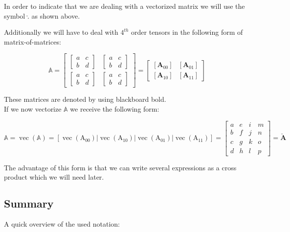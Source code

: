 In order to indicate that we are dealing with a vectorized matrix we will use the symbol $\check{.}$ as shown above.

Additionally we will have to deal with $4^{th}$ order tensors in the following form of matrix-of-matrices:

\[
\mathbb{A} = 
\left[\begin{array}{cc}{\begin{bmatrix} a & c \\ b & d \end{bmatrix}} & {\begin{bmatrix} a & c \\ b & d \end{bmatrix}} \\ {\begin{bmatrix} a & c \\ b & d \end{bmatrix}} & {\begin{bmatrix} a & c \\ b & d \end{bmatrix}}\end{array}\right]
=
\left[\begin{array}{cc}{\left[\mathbf{A}_{00}\right]} & {\left[\mathbf{A}_{01}\right]} \\ {\left[\mathbf{A}_{10}\right]} & {\left[\mathbf{A}_{11}\right]}\end{array}\right]
\]

These matrices are denoted by using blackboard bold.
\\
If we now vectorize $\mathbb{A}$ we receive the following form:

\[
\mathbb{A} = \operatorname{vec}(\mathbb{A})=\left[\operatorname{vec}\left(\mathrm{A}_{00}\right)\left|\operatorname{vec}\left(\mathrm{A}_{10}\right)\right| \operatorname{vec}\left(\mathrm{A}_{01}\right) | \operatorname{vec}\left(\mathrm{A}_{11}\right)\right]
=\left[\begin{array}{llll}{a} & {e} & {i} & {m} \\ {b} & {f} & {j} & {n} \\ {c} & {g} & {k} & {o} \\ {d} & {h} & {l} & {p}\end{array}\right]=\boldsymbol{\check{A}}
\]

The advantage of this form is that we can write several expressions as a cross product which we will need later.

\subsection{Summary}
A quick overview of the used notation:

